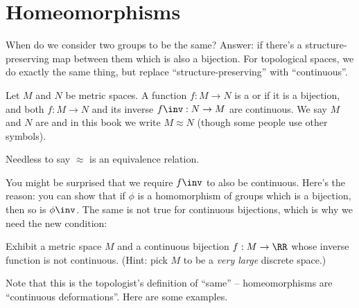 \section{Homeomorphisms}
When do we consider two groups to be the same?
Answer: if there's a structure-preserving map between them which is also a bijection.
For topological spaces, we do exactly the same thing, but replace ``structure-preserving'' with ``continuous''.

\begin{definition}
	Let $M$ and $N$ be metric spaces.
	A function $f : M \to N$ is a
	 or  if it is a bijection,
	and both $f : M \to N$ and its inverse $f\inv : N \to M$ are continuous.
	We say $M$ and $N$ are  and in this book we write $M \approx N$ (though some people use other symbols).
\end{definition}
Needless to say $\approx$ is an equivalence relation.

You might be surprised that we require $f\inv$ to also be continuous.
Here's the reason: you can show that if $\phi$ is a homomorphism of groups
which is a bijection, then so is $\phi\inv$.
The same is not true for continuous bijections, which is why we need the new condition:
\begin{exercise}
	Exhibit a metric space $M$ and a continuous bijection $f : M \to \RR$
	whose inverse function is not continuous.
	(Hint: pick $M$ to be a \emph{very large} discrete space.)
\end{exercise}

Note that this is the topologist's definition of ``same'' --
homeomorphisms are ``continuous deformations''.
Here are some examples.

